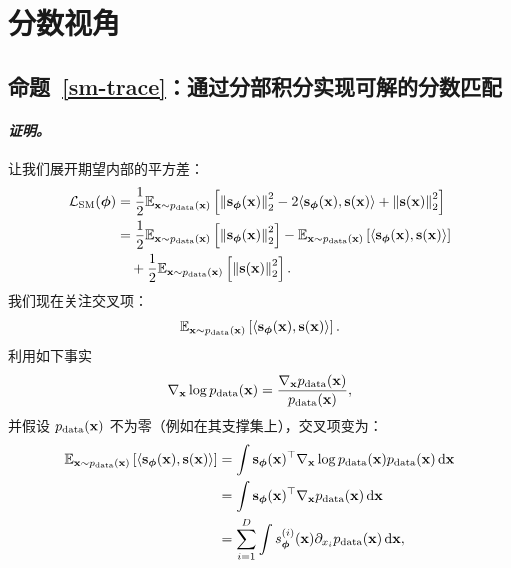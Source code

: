 \clearpage
\newpage

\section{分数视角}\label{app-sec:score-proof}

\subsection{命题~\ref{sm-trace}：通过分部积分实现可解的分数匹配}\label{app-sec:sm-trace}
\paragraph{\textit{证明。}}

        让我们展开期望内部的平方差：
        \begin{align*}
        \mathcal{L}_{\text{SM}}(\bm{\phi}) &= \frac{1}{2}\mathbb{E}_{{\mathbf{x}} \sim p_{\text{data}}({\mathbf{x}})} \left[ \left\lVert{\mathbf{s}}_{\bm{\phi}}({\mathbf{x}})\right\rVert_2^2 - 2 \langle {\mathbf{s}}_{\bm{\phi}}({\mathbf{x}}), {\mathbf{s}}({\mathbf{x}}) \rangle + \left\lVert{\mathbf{s}}({\mathbf{x}})\right\rVert_2^2 \right] \\
        &= \frac{1}{2}\mathbb{E}_{{\mathbf{x}} \sim p_{\text{data}}({\mathbf{x}})} \left[ \left\lVert{\mathbf{s}}_{\bm{\phi}}({\mathbf{x}})\right\rVert_2^2 \right] - \mathbb{E}_{{\mathbf{x}} \sim p_{\text{data}}({\mathbf{x}})} \left[ \langle {\mathbf{s}}_{\bm{\phi}}({\mathbf{x}}), {\mathbf{s}}({\mathbf{x}}) \rangle \right] \\
        &\quad + \frac{1}{2}\mathbb{E}_{{\mathbf{x}} \sim p_{\text{data}}({\mathbf{x}})} \left[ \left\lVert{\mathbf{s}}({\mathbf{x}})\right\rVert_2^2 \right].
        \end{align*}
        我们现在关注交叉项：
        \[
        \mathbb{E}_{{\mathbf{x}} \sim p_{\text{data}}({\mathbf{x}})} \left[ \langle {\mathbf{s}}_{\bm{\phi}}({\mathbf{x}}), {\mathbf{s}}({\mathbf{x}}) \rangle \right].
        \]
        利用如下事实
        \[
        \nabla_{{\mathbf{x}}} \log p_{\text{data}}({\mathbf{x}}) = \frac{\nabla_{{\mathbf{x}}}p_{\text{data}}({\mathbf{x}})}{p_{\text{data}}({\mathbf{x}})},
        \]
        并假设 $p_{\text{data}}({\mathbf{x}})$ 不为零（例如在其支撑集上），交叉项变为：
        \begin{align*}
            \mathbb{E}_{{\mathbf{x}} \sim p_{\text{data}}({\mathbf{x}})} \left[ \langle {\mathbf{s}}_{\bm{\phi}}({\mathbf{x}}), {\mathbf{s}}({\mathbf{x}}) \rangle \right] 
             &= \int {\mathbf{s}}_{\bm{\phi}}({\mathbf{x}})^\top  \nabla_{{\mathbf{x}}} \log p_{\text{data}}({\mathbf{x}}) p_{\text{data}}({\mathbf{x}}) \mathop{}\!\mathrm{d} {\mathbf{x}} \\
             &= \int {\mathbf{s}}_{\bm{\phi}}({\mathbf{x}})^\top  \nabla_{{\mathbf{x}}}p_{\text{data}}({\mathbf{x}}) \mathop{}\!\mathrm{d} {\mathbf{x}} \\
             &= \sum_{i=1}^{D} \int  s_{\bm{\phi}}^{(i)}({\mathbf{x}}) \partial_{x_i}p_{\text{data}}({\mathbf{x}}) \mathop{}\!\mathrm{d} {\mathbf{x}},
        \end{align*}
